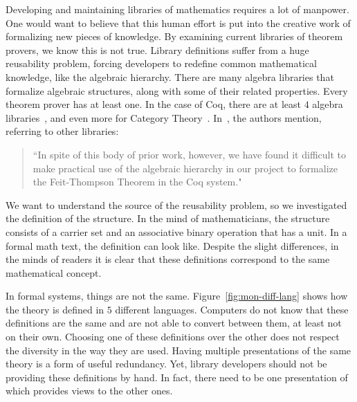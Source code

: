Developing and maintaining libraries of mathematics requires a lot of manpower. One would want to believe that this human effort is put into the creative work of formalizing new pieces of knowledge. By examining current libraries of theorem provers, we know this is not true. Library definitions suffer from a huge reusability problem, forcing developers to redefine common mathematical knowledge, like the algebraic hierarchy. There are many algebra libraries that formalize algebraic structures, along with some of their related properties. Every theorem prover has at least one. In the case of Coq, there are at least $4$ algebra libraries~\cite{Gonthier2009,Geuvers2002,coq-contribs-algebra,Spitters2010}, and even more for Category Theory~\cite{spivak2014coqcats}. 
In~\cite{Gonthier2009}, the authors mention, referring to other libraries:  
\begin{quote}
    ``In spite of this body of prior work, however, we have found it
    difficult to make practical use of the algebraic hierarchy in our project to
    formalize the Feit-Thompson Theorem in the Coq system."
\end{quote}
We want to understand the source of the reusability problem, so we investigated the definition of the  structure. In the mind of mathematicians, the  structure consists of a carrier set and an associative binary operation that has a unit. In a formal math text, the definition can look like. Despite the slight differences, in the minds of readers it is clear that these definitions correspond to the same mathematical concept. 

In formal systems, things are not the same. Figure~\ref{fig:mon-diff-lang} shows how the  theory is defined in $5$ different languages. Computers do not know that these definitions are the same and are not able to convert between them, at least not on their own. Choosing one of these definitions over the other does not respect the diversity in the way they are used. Having multiple presentations of the same theory is a form of useful redundancy. Yet, library developers should not be providing these definitions by hand. In fact, there need to be one presentation of  which provides views to the other ones. 

